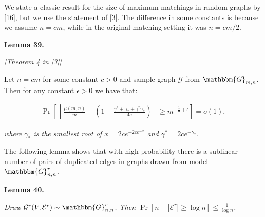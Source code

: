 


We state a classic result for the size of maximum matchings in random graphs by [16], but we use the statement of [3]. The difference in some constants is because we assume $n=cm$, while in the original matching setting it was $n=cm/2$.\par





\par\medskip\noindent\textbf{\textbf{Lemma 39}\textbf{.}}\par



{\itshape [Theorem 4 in [3]]

Let $n=cm$ for some constant $c>0$ and sample graph $\mathcal{G}$ from $\mathbbm{G}_{m,n}$.
Then for any constant $\epsilon>0$ we have that:}\par


\[\begin{gathered}
\displaystyle\Pr\left[\middle|\frac{\mu(m,n)}{m}-\left(1-\frac{\gamma^{*}+\gamma_{*}+\gamma^{*}\gamma_{*}}{4c}\right)\middle|\geq m^{-\frac{1}{7}+\epsilon}\right]=o(1),
\end{gathered}\]


\emph{where $\gamma_{*}$ is the smallest root of $x=2ce^{-2ce^{-x}}$ and $\gamma^{*}=2ce^{-\gamma_{*}}$.}\par






The following lemma shows that with high probability there is a sublinear number of pairs of duplicated edges in graphs drawn from model $\mathbbm{G}^{r}_{n,n}$.\par





\par\medskip\noindent\textbf{\textbf{Lemma 40}\textbf{.}}\par



\emph{Draw $\mathcal{G}^{r}(V,\mathcal{E}^{r})\sim\mathbbm{G}^{r}_{n,n}$.
Then $\Pr\left[n-|\mathcal{E}^{r}|\geq\log{n}\right]\leq\frac{1}{\log{n}}$.}\par






